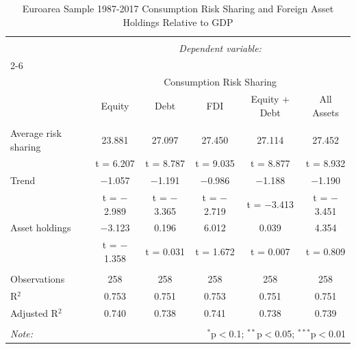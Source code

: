
\begin{table}[!htbp] \centering 
  \caption{Euroarea Sample 1987-2017 Consumption Risk Sharing and Foreign Asset Holdings Relative to GDP} 
  \label{} 
\begin{tabular}{@{\extracolsep{5pt}}lccccc} 
\\[-1.8ex]\hline 
\hline \\[-1.8ex] 
 & \multicolumn{5}{c}{\textit{Dependent variable:}} \\ 
\cline{2-6} 
\\[-1.8ex] & \multicolumn{5}{c}{Consumption Risk Sharing} \\ 
 & Equity & Debt & FDI & Equity + Debt & All Assets \\ 
\hline \\[-1.8ex] 
 Average risk sharing & 23.881 & 27.097 & 27.450 & 27.114 & 27.452 \\ 
  & t = 6.207 & t = 8.787 & t = 9.035 & t = 8.877 & t = 8.932 \\ 
  Trend & $-$1.057 & $-$1.191 & $-$0.986 & $-$1.188 & $-$1.190 \\ 
  & t = $-$2.989 & t = $-$3.365 & t = $-$2.719 & t = $-$3.413 & t = $-$3.451 \\ 
  Asset holdings & $-$3.123 & 0.196 & 6.012 & 0.039 & 4.354 \\ 
  & t = $-$1.358 & t = 0.031 & t = 1.672 & t = 0.007 & t = 0.809 \\ 
 \hline \\[-1.8ex] 
Observations & 258 & 258 & 258 & 258 & 258 \\ 
R$^{2}$ & 0.753 & 0.751 & 0.753 & 0.751 & 0.751 \\ 
Adjusted R$^{2}$ & 0.740 & 0.738 & 0.741 & 0.738 & 0.739 \\ 
\hline 
\hline \\[-1.8ex] 
\textit{Note:}  & \multicolumn{5}{r}{$^{*}$p$<$0.1; $^{**}$p$<$0.05; $^{***}$p$<$0.01} \\ 
\end{tabular} 
\end{table} 
